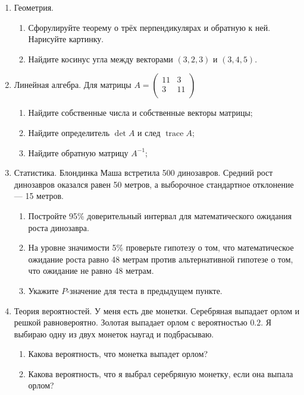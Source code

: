 \documentclass[12pt]{article}
\DeclareMathOperator{\tr}{trace}
\begin{document}
\newpage

\begin{enumerate}

  \item Геометрия.
  \begin{enumerate}
    \item Сфорулируйте теорему о трёх перпендикулярах и обратную к ней. Нарисуйте картинку.
    \item Найдите косинус угла между векторами $(3, 2, 3)$ и $(3, 4, 5)$.
  \end{enumerate}
  

  \item Линейная алгебра. Для матрицы
$
  A=\begin{pmatrix}
  11 & 3  \\
  3 & 11  \\
  \end{pmatrix}
$

  \begin{enumerate}
  \item Найдите собственные числа и собственные векторы матрицы;
  \item Найдите определитель $\det A$ и след $\tr A$;
 \item Найдите обратную матрицу $A^{-1}$;
  \end{enumerate}


  \item Статистика. Блондинка Маша встретила 500 динозавров.
  Средний рост динозавров оказался равен 50 метров, а выборочное стандартное отклонение — 15 метров.

  \begin{enumerate}
    \item Постройте 95\% доверительный интервал для математического ожидания роста динозавра.
    \item На уровне значимости 5\% проверьте гипотезу о том, что математическое ожидание
    роста равно 48 метрам против альтернативной гипотезе о том, что ожидание не равно 48 метрам.
    \item Укажите $P$-значение для теста в предыдущем пункте.
  \end{enumerate}

 \item Теория вероятностей. У меня есть две монетки. Серебряная выпадает орлом и решкой равновероятно.
 Золотая выпадает орлом с вероятностью $0.2$. 
 Я выбираю одну из двух монеток наугад и подбрасываю.
 \begin{enumerate}
   \item Какова вероятность, что монетка выпадет орлом?
   \item Какова вероятность, что я выбрал серебряную монетку, если она выпала орлом?
 \end{enumerate}

\end{enumerate}
\end{document}
